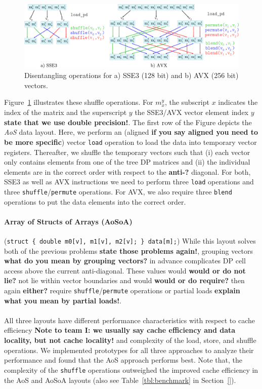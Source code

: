 \documentclass[runningheads,a4paper]{llncs}
\begin{document}
\begin{figure}[ht!]
  \centering
  \includegraphics[scale=0.6]{figures/shuffle.pdf}
  \caption{Disentangling operations for a) SSE3 (128 bit) and b) AVX (256 bit) vectors.}
  \label{fig:shufflesse}
\end{figure}

Figure~\ref{fig:shufflesse} illustrates these shuffle operations. 
For $m_x^y$, the subscript $x$ indicates
the index of the matrix and the superscript $y$ the SSE3/AVX vector element index $y$ {\bf state that we use double precision!}.
The first row of the Figure depicts the {\em AoS} data layout. 
Here, we perform an (aligned {\bf if you say aligned you need to be more specific}) vector \texttt{load} operation 
to load the data into temporary vector registers. 
Thereafter, we shuffle the temporary vectors such that (i) each vector only contains elements from one of the tree DP matrices and 
(ii) the individual elements are in the correct order with respect to  the {\bf anti-?} diagonal. 
For both, SSE3 as well as AVX instructions we need to perform three \texttt{load} operations and three \texttt{shuffle}/\texttt{permute} operations. 
For AVX, we also require three \texttt{blend} operations to put the data elements into the correct order. 

\paragraph*{Array of Structs of Arrays (AoSoA)} ({\small\texttt{struct \{ double m0[v],
m1[v], m2[v]; \} data[m];}}) While this layout solves both of the previous problems {\bf state those problems again!},
grouping vectors {\bf what do you mean by grouping vectors?} in advance complicates DP cell access above the current anti-diagonal.
These values would {\bf would or do not lie?} not lie within vector boundaries and would {\bf would or do require?} then
again {\bf either?} require \texttt{shuffle}/\texttt{permute} operations or partial loads {\bf explain what you mean by partial loads!}.

\paragraph*{} All three layouts have different performance characteristics with respect to
cache efficiency {\bf Note to team I: we usually say cache efficiency and data locality, but not cache locality!} 
and complexity of the load, store, and shuffle operations.
We implemented prototypes for all three approaches to analyze their
performance and found that the AoS approach performs best.  
Note that, the complexity of the \texttt{shuffle} operations outweighed the improved cache efficiency in the AoS and
AoSoA layouts (also see Table~\ref{tbl:benchmark} in Section~\ref{}). 
\end{document}
